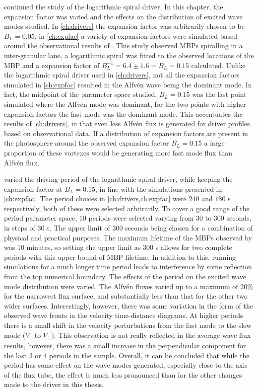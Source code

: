  continued the study of the logarithmic spiral driver.
In this chapter, the expansion factor was varied and the effects on the distribution of excited wave modes studied.
In \cref{ch:drivers} the expansion factor was arbitrarily chosen to be $B_L = 0.05$, in \cref{ch:expfac} a variety of expansion factors were simulated based around the observational results of \cite{bonet2008}.
This study observed MBPs spiralling in a inter-granular lane, a logarithmic spiral was fitted to the observed locations of the MBP and a expansion factor of $B_L^{-1} = 6.4 \pm 1.6 = B_L = 0.15$ calculated.
Unlike the logarithmic spiral driver used in \cref{ch:drivers}, not all the expansion factors simulated in \cref{ch:expfac} resulted in the Alfv\'en wave being the dominant mode.
In fact, the midpoint of the parameter space studied, $B_L = 0.15$ was the last point simulated where the Alfv\'en mode was dominant, for the two points with higher expansion factors the fast mode was the dominant mode.
This accentuates the results of \cref{ch:drivers}, in that even less Alfv\'en flux is generated for driver profiles based on observational data.
If a distribution of expansion factors are present in the photosphere around the observed expansion factor $B_L = 0.15$ a large proportion of these vortexes would be generating more fast mode flux than Alfv\'en flux.

 varied the driving period of the logarithmic spiral driver, while keeping the expansion factor at $B_L = 0.15$, in line with the simulations presented in \cref{ch:expfac}.
The period choices in \cref{ch:drivers,ch:expfac} were $240$ and $180$ s respectively, both of these were selected arbitrarily.
To cover a good range of the period parameter space, $10$ periods were selected varying from $30$ to $300$ seconds, in steps of $30$ s.
The upper limit of $300$ seconds being chosen for a combination of physical and practical purposes.
The maximum lifetime of the MBPs observed by \cite{sanchezalmeida2004} was $10$ minutes, so setting the upper limit as $300$ s allows for two complete periods with this upper bound of MBP lifetime.
In addition to this, running simulations for a much longer time period leads to interference by some reflection from the top numerical boundary.
The effects of the period on the excited wave mode distribution were varied.
The Alfv\'en fluxes varied up to a maximum of $20$\% for the narrowest flux surface, and substantially less than that for the other two wider surfaces.
Interestingly, however, there was some variation in the form of the observed wave fronts in the velocity time-distance diagrams.
At higher periods there is a small shift in the velocity perturbations from the fast mode to the slow mode ($V_\parallel$ to $V_\perp$).
This observation is not really reflected in the average wave flux results, however, there was a small increase in the perpendicular component for the last $3$ or $4$ periods in the sample.
Overall, it can be concluded that while the period has some effect on the wave modes generated, especially close to the axis of the flux tube, the effect is much less pronounced than for the other changes made to the driver in this thesis.

